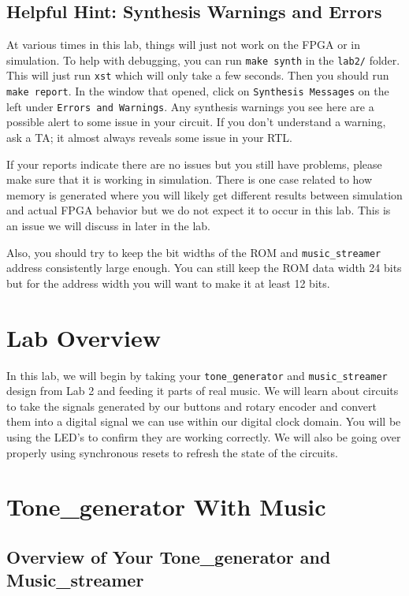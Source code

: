 \documentclass[11pt]{article}
\begin{document}
\subsection{Helpful Hint: Synthesis Warnings and Errors}
At various times in this lab, things will just not work on the FPGA or in simulation. To help with debugging, you can run \verb|make synth| in the \verb|lab2/| folder. This will just run \verb|xst| which will only take a few seconds. Then you should run \verb|make report|. In the window that opened, click on \verb|Synthesis Messages| on the left under \verb|Errors and Warnings|. Any synthesis warnings you see here are a possible alert to some issue in your circuit. If you don't understand a warning, ask a TA; it almost always reveals some issue in your RTL.

If your reports indicate there are no issues but you still have problems, please make sure that it is working in simulation. There is one case related to how memory is generated where you will likely get different results between simulation and actual FPGA behavior but we do not expect it to occur in this lab. This is an issue we will discuss in later in the lab. 

Also, you should try to keep the bit widths of the ROM and \verb|music_streamer| address consistently large enough. You can still keep the ROM data width 24 bits but for the address width you will want to make it at least 12 bits.  
\section{Lab Overview}

In this lab, we will begin by taking your \verb|tone_generator| and \verb|music_streamer| design from Lab 2 and feeding it parts of real music. We will learn about circuits to take the signals generated by our buttons and rotary encoder and convert them into a digital signal we can use within our digital clock domain. You will be using the LED's to confirm they are working correctly. We will also be going over properly using synchronous resets to refresh the state of the circuits. 

\section{Tone\_generator With Music}

\subsection{Overview of Your Tone\_generator and Music\_streamer}
\end{document}
